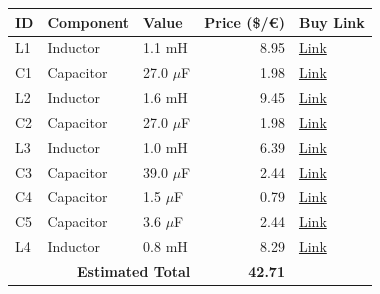 \begin{table}[H]
    \centering
    \renewcommand{\arraystretch}{1.5}
    \begin{tabular}{@{}lllrl@{}}
        \toprule
        \textbf{ID} & \textbf{Component} & \textbf{Value} & \textbf{Price (\$/€)} & \textbf{Buy Link} \\
        \midrule
        L1 & Inductor & 1.1 mH & 8.95 & \href{https://www.soundimports.eu/en/jantzen-audio-000-2343.html}{Link} \\
        C1 & Capacitor & 27.0 $\mu$F & 1.98 & \href{https://www.soundimports.eu/en/jantzen-audio-001-6150.html}{Link} \\
        L2 & Inductor & 1.6 mH & 9.45 & \href{https://www.soundimports.eu/en/jantzen-audio-000-2389.html}{Link} \\
        C2 & Capacitor & 27.0 $\mu$F & 1.98 & \href{https://www.soundimports.eu/en/jantzen-audio-001-6150.html}{Link} \\
        L3 & Inductor & 1.0 mH & 6.39 & \href{https://www.parts-express.com/Dayton-Audio-IC181-1.0mH-18-AWG-Laminated-Iron-Core-Inductor-257-650}{Link} \\
        C3 & Capacitor & 39.0 $\mu$F & 2.44 & \href{https://www.soundimports.eu/en/jantzen-audio-001-6156.html}{Link} \\
        C4 & Capacitor & 1.5 $\mu$F & 0.79 & \href{https://www.parts-express.com/Solen-1.5uF-400V-Polypropylene-Capacitor-027-528}{Link} \\
        C5 & Capacitor & 3.6 $\mu$F & 2.44 & \href{https://www.soundimports.eu/en/jantzen-audio-001-0244.html}{Link} \\
        L4 & Inductor & 0.8 mH & 8.29 & \href{https://www.parts-express.com/Dayton-Audio-LW18-80-0.80mH-18-AWG-Perfect-Layer-Inductor-257-822}{Link} \\
        \midrule
        \multicolumn{3}{r}{\textbf{Estimated Total}} & \textbf{42.71} & \\
        \bottomrule
    \end{tabular}
\end{table}
